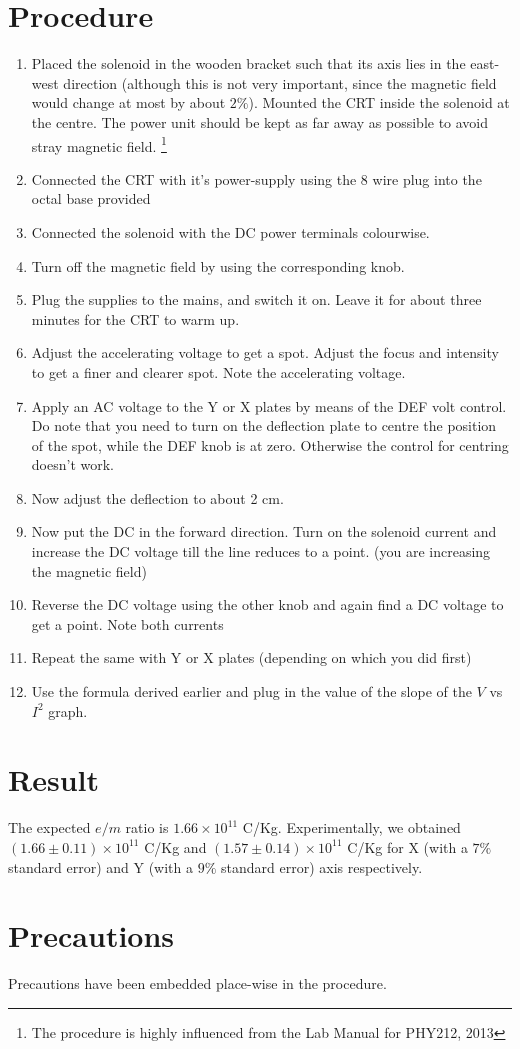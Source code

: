 \section{Procedure}	
	\begin{enumerate}
		\item Placed the solenoid in the wooden bracket such that its axis lies in the east-west direction (although this is not very important, since the magnetic field would change at most by about $2\%$). Mounted the CRT inside the solenoid at the centre. The power unit should be kept as far away as possible to avoid stray magnetic field. \footnote {The procedure is highly influenced from the Lab Manual for PHY212, 2013}
		\item Connected the CRT with it's power-supply using the 8 wire plug into the octal base provided
		\item Connected the solenoid with the DC power terminals colourwise.
		\item Turn off the magnetic field by using the corresponding knob.
		\item Plug the supplies to the mains, and switch it on. Leave it for about three minutes for the CRT to warm up.
		\item Adjust the accelerating voltage to get a spot. Adjust the focus and intensity to get a finer and clearer spot. Note the accelerating voltage. 
		\item Apply an AC voltage to the Y or X plates by means of the DEF volt control. Do note that you need to turn on the deflection plate to centre the position of the spot, while the DEF knob is at zero. Otherwise the control for centring doesn't work.
		\item Now adjust the deflection to about 2 cm.
		\item Now put the DC in the forward direction. Turn on the solenoid current and increase the DC voltage till the line reduces to a point. (you are increasing the magnetic field)
		\item Reverse the DC voltage using the other knob and again find a DC voltage to get a point. Note both currents
		\item Repeat the same with Y or X plates (depending on which you did first)
		\item Use the formula derived earlier and plug in the value of the slope of the $V$ vs $I^2$ graph.
	\end{enumerate}

\section{Result}
	The expected $e/m$ ratio is $1.66 \times 10^{11}$ C/Kg. Experimentally, we obtained $(1.66 \pm 0.11)\times 10^{11}$ C/Kg and $(1.57 \pm 0.14) \times 10^{11}$ C/Kg for X (with a $7\%$ standard error) and Y (with a $9\%$ standard error) axis respectively.

\section{Precautions}
	Precautions have been embedded place-wise in the procedure.
